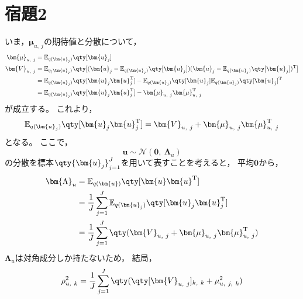 \documentclass[class=jsarticle, crop=false, dvipdfmx, fleqn]{standalone}
\begin{document}
\section*{宿題2}

いま，\(\bm{\mu}_{u,\ j}\)の期待値と分散について，
\begin{align}
    \bm{\mu}_{u,\ j}
        & = \mathbb{E}_{q(\bm{u}_j)} \qty[\bm{u}_j] \\
    \bm{V}_{u,\ j}
        & = \mathbb{E}_{q_(\bm{u}_j)} \qty[(\bm{u}_j - \mathbb{E}_{q(\bm{u}_j)} \qty[\bm{u}_j])(\bm{u}_j - \mathbb{E}_{q(\bm{u}_j)} \qty[\bm{u}_j])^\mathrm{T}] \\
        & = \mathbb{E}_{q(\bm{u}_j)} \qty[\bm{u}_j \bm{u}_j^\mathrm{T}] - \mathbb{E}_{q(\bm{u}_j)} \qty[\bm{u}_j] \mathbb{E}_{q(\bm{u}_j)} \qty[\bm{u}_j]^\mathrm{T} \\
        & = \mathbb{E}_{q(\bm{u}_j)} \qty[\bm{u}_j \bm{u}_j^\mathrm{T}] - \bm{\mu}_{u,\ j} \bm{\mu}_{u,\ j}^\mathrm{T}
\end{align}
が成立する。
これより，
\begin{equation}
    \mathbb{E}_{q(\bm{u}_j)} \qty[\bm{u}_j \bm{u}_j^\mathrm{T}] = \bm{V}_{u,\ j} + \bm{\mu}_{u,\ j} \bm{\mu}_{u,\ j}^\mathrm{T}
\end{equation}
となる。
ここで，
\begin{equation}
    \bm{u} \sim \mathcal{N}(\bm{0},\ \bm{\Lambda}_u)
\end{equation}
の分散を標本\(\qty{\bm{u}_j}_{j=1}^{J}\)を用いて表すことを考えると，
平均\(\bm{0}\)から，
\begin{align}
    \bm{\Lambda}_u
        & = \mathbb{E}_{q(\bm{u})} \qty[\bm{u} \bm{u}^\mathrm{T}] \\
        & = \frac{1}{J} \sum_{j=1}^{J} \mathbb{E}_{q(\bm{u}_j)} \qty[\bm{u}_j \bm{u}_j^\mathrm{T}] \\
        & = \frac{1}{J} \sum_{j=1}^{J} \qty(\bm{V}_{u,\ j} + \bm{\mu}_{u,\ j} \bm{\mu}_{u,\ j}^\mathrm{T})
\end{align}
\(\bm{\Lambda}_u\)は対角成分しか持たないため，
結局，
\begin{equation}
    \rho_{u,\ k}^2 = \frac{1}{J} \sum_{j=1}^{J} \qty(\qty[\bm{V}_{u,\ j}]_{k,\ k} + \mu_{u,\ j,\ k}^2)
\end{equation}
\end{document}
